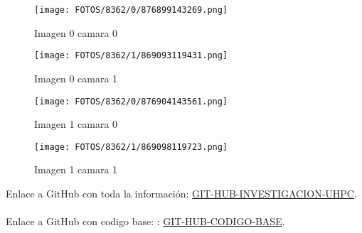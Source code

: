 \documentclass{article}
\begin{document}
\begin{figure}[H]
  \centering
  \begin{minipage}[b]{0.45\textwidth}
    \centering
    \texttt{[image: FOTOS/8362/0/876899143269.png]}
    \caption{Imagen 0 camara 0}
  \end{minipage}
  \begin{minipage}[b]{0.45\textwidth}
    \centering
    \texttt{[image: FOTOS/8362/1/869093119431.png]}
    \caption{Imagen 0 camara 1}
  \end{minipage}
  \begin{minipage}[b]{0.45\textwidth}
    \centering
    \texttt{[image: FOTOS/8362/0/876904143561.png]}
    \caption{Imagen 1 camara 0}
  \end{minipage}
  \begin{minipage}[b]{0.45\textwidth}
    \centering
    \texttt{[image: FOTOS/8362/1/869098119723.png]}
    \caption{Imagen 1 camara 1}
  \end{minipage}
\end{figure}



 


























\noindent Enlace a GitHub con toda la información: \href{https://github.com/LukasWolff2002/SINCRONIZACION_CAMARAS_BASLER}{GIT-HUB-INVESTIGACION-UHPC}.
\\ \\
\noindent Enlace a GitHub con codigo base: : \href{https://github.com/basler/pypylon/blob/master/samples/grabmultiplecameras.py}{GIT-HUB-CODIGO-BASE}.
\end{document}

